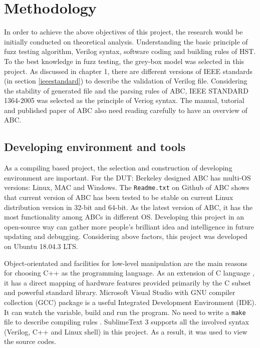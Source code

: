 \section{Methodology}
In order to achieve the above objectives of this project, the research would be initially conducted on theoretical analysis. Understanding the basic principle of fuzz testing algorithm, Verilog syntax, software coding and building rules of HST. To the best knowledge in fuzz testing, the grey-box model was selected in this project. As discussed in chapter 1, there are different versions of IEEE standards (in section \ref{ieeestandard}) to describe the validation of Verilog file. Considering the stability of generated file and the parsing rules of ABC, IEEE STANDARD 1364-2005\cite{1620780} was selected as the principle of Veriog syntax. The manual, tutorial and published paper of ABC also need reading carefully to have an overview of ABC.

\subsection{Developing environment and tools}
As a compiling based project, the selection and construction of developing environment are important. For the DUT: Berkeley designed ABC has multi-OS versions: Linux, MAC and Windows. The \texttt{Readme.txt} on Github of ABC shows that current version of ABC has been tested to be stable on current Linux distribution version in 32-bit and 64-bit. As the latest version of ABC, it has the most functionality among ABCs in different OS. Developing this project in an open-source way can gather more people's brilliant idea and intelligence in future updating and debugging.  Considering above factors, this project was developed on Ubuntu 18.04.3 LTS.

Object-orientated and facilities for low-level manipulation are the main reasons for choosing C++ as the programming language. As an extension of C language \cite{stroustrup2000c++}, it has a direct mapping of hardware features provided primarily by the C subset and powerful standard library. Microsoft Visual Studio with GNU compiler collection (GCC) package is a useful Integrated Development Environment (IDE). It can watch the variable, build and run the program. No need to write a \texttt{make} file to describe compiling rules \cite{kahlert2018visual}. SublimeText 3 supports all the involved syntax (Verilog, C++ and Linux shell) in this project. As a result, it was used to view the source codes.

